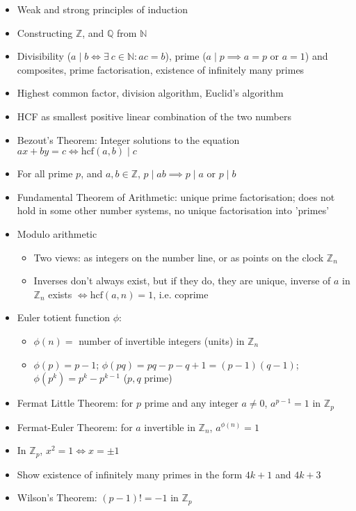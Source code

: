 \documentclass[12pt]{article}
\begin{document}
\begin{itemize}
\item Weak and strong principles of induction
\item Constructing $\mathbb{Z}$, and $\mathbb{Q}$ from $\mathbb{N}$
\item Divisibility ($a \mid b \iff \exists \: c \in \mathbb{N} : ac = b$), prime ($a \mid p \implies a=p \textrm{ or } a=1$) and composites, prime factorisation, existence of infinitely
many primes
\item Highest common factor, division algorithm, Euclid's algorithm
\item HCF as smallest positive linear combination of the two numbers 
\item Bezout's Theorem: Integer solutions to the equation $ax+by=c\iff\textrm{hcf}(a,b)\mid c$
\item For all prime $p$, and $a,b\in\mathbb{Z}$, $p\mid ab\implies p\mid a\textrm{ or }p\mid b$
\item Fundamental Theorem of Arithmetic: unique prime factorisation; does
not hold in some other number systems, no unique factorisation into
'primes'
\item Modulo arithmetic
\begin{itemize}
\item Two views: as integers on the number line, or as points on the clock
$\mathbb{Z}_{n}$
\item Inverses don't always exist, but if they do, they are unique, inverse
of $a$ in $\mathbb{Z}_{n}$ exists $\iff\textrm{hcf}(a,n)=1$, i.e.
coprime
\end{itemize}
\item Euler totient function $\phi$:
\begin{itemize}
\item $\phi(n)=$ number of invertible integers (units) in $\mathbb{Z}_{n}$ 
\item $\phi(p)=p-1$; $\phi(pq)=pq-p-q+1=(p-1)(q-1)$; $\phi(p^{k})=p^{k}-p^{k-1}$
($p,q$ prime)
\end{itemize}
\item Fermat Little Theorem: for $p$ prime and any integer $a\neq 0$, $a^{p-1}=1$ in $\mathbb{Z}_{p}$
\item Fermat-Euler Theorem: for $a$ invertible in $\mathbb{Z}_{n}$, $a^{\phi(n)}=1$
\item In $\mathbb{Z}_{p}$, $x^{2}=1\iff x=\pm1$ 
\item Show existence of infinitely many primes in the form $4k+1$ and $4k+3$ 
\item Wilson's Theorem: $(p-1)!=-1\textrm{ in }\mathbb{Z}_{p}$

\end{itemize}
\end{document}
